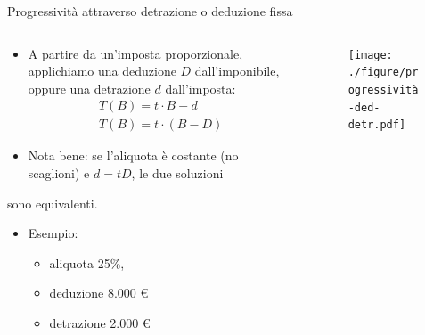 \documentclass[11pt]{beamer}
\newcommand\€{\,\text{€}}
\begin{document}
\begin{frame}{Progressività attraverso detrazione o deduzione fissa}
\begin{columns}
\begin{column}{.4\columnwidth}
\small
\begin{itemize}
\item A partire da un'imposta proporzionale, applichiamo una deduzione $D$ dall'imponibile, oppure una detrazione $d$ dall'imposta:
\begin{gather*}
T(B) = t\cdot B - d \\
T(B)=t\cdot (B-D)
\end{gather*}
\item Nota bene: se l'aliquota è costante (no scaglioni) e $d=tD$, le due soluzioni
\end{itemize}
sono equivalenti.
\begin{itemize}
\item Esempio:
\begin{itemize}
\item aliquota 25\%,
\item deduzione 8.000 €
\item detrazione 2.000 €
\end{itemize}
\end{itemize}
\end{column}

\begin{column}{.6\columnwidth}
\begin{figure}
\centering
\texttt{[image: ./figure/progressività-ded-detr.pdf]}
\end{figure}
\end{column}
\end{columns}
\end{frame}
\end{document}
